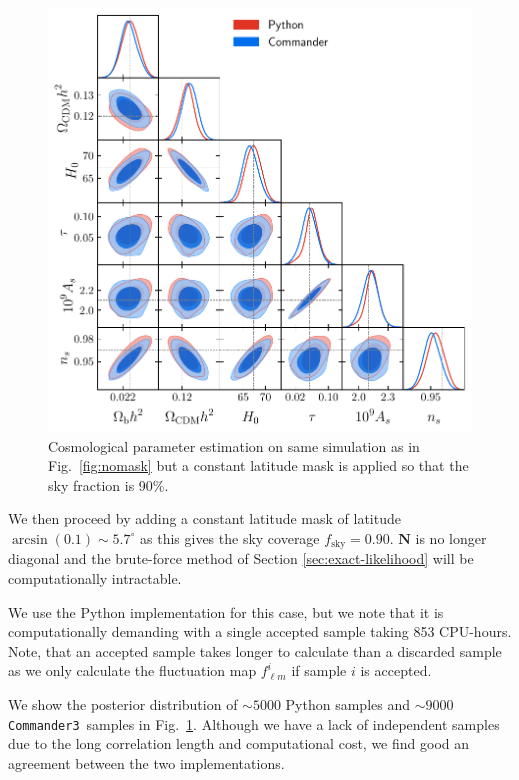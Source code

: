 \documentclass[twocolumn]{../common/aa}
\def\commanderthree{\texttt{Commander3}}
\begin{document}
\begin{figure}
	\centering
	\includegraphics[width=\linewidth]{figures/dist_posterior_10_mask.pdf}
	\caption{\label{fig:mask10}Cosmological parameter estimation on same simulation as in Fig.~\ref{fig:nomask} but a constant latitude mask is applied so that the sky fraction is 90\%.}
\end{figure}

We then proceed by adding a constant latitude mask of latitude $\arcsin(0.1) \sim 5.7^\circ$ as this gives the sky coverage $f_{\mathrm{sky}} = 0.90$. $\textbf{N}$ is no longer diagonal and the brute-force method of Section \ref{sec:exact-likelihood} will be computationally intractable. 

We use the Python implementation for this case, but we note that it is computationally demanding with a single accepted sample taking 853 CPU-hours. Note, that an accepted sample takes longer to calculate than a discarded sample as we only calculate the fluctuation map $f^i_{\ell m}$ if sample $i$ is accepted.

We show the posterior distribution of $\sim 5000$ Python samples and $\sim 9000$ \commanderthree\ samples in Fig.~\ref{fig:mask10}. Although we have a lack of independent samples due to the long correlation length and computational cost, we find good an agreement between the two implementations.
\end{document}
